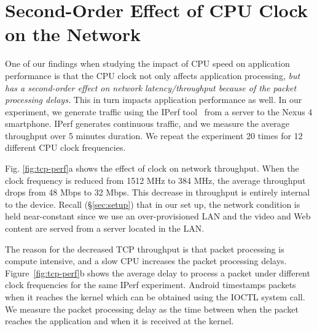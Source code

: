 
\begin{figure*}[h]
     \vspace{-0.1in}
     \caption{Second-order effect of CPU speed on network. (a) TCP throughput reduces from an average of 48 Mbps to 32 Mbps under slow clock under the same network conditions, b) The cause for this reduction in throughput is internal to the device; the average TCP packet processing delay increases by 12 ms at slow CPU speeds. Experiments conducted on Nexus 4.}
     \label{fig:tcp-perf}
\end{figure*}

\section{Second-Order Effect of CPU Clock on the Network} \label{label:throughput}

One of our findings when studying the impact of CPU speed on application performance is that 
the CPU clock not only affects application processing, {\em but has a second-order effect on network 
latency/throughput because of the packet processing delays.} This in turn impacts
application performance as well. In our experiment, we generate traffic using the IPerf tool~\cite{iperf-2015} from a server to the Nexus 4 smartphone. IPerf generates continuous traffic, and we measure the average throughput over 5 minutes duration. We repeat the experiment 20 times for 12 different CPU clock frequencies. 

Fig. \ref{fig:tcp-perf}a shows the effect of clock on network throughput. When the clock frequency is reduced from 1512 MHz to 384 MHz, the average throughput drops from 48 Mbps to 32 Mbps. This decrease in throughput is entirely internal to the device. Recall (\S\ref{sec:setup}) that in our set up, the network condition is held near-constant since we use an over-provisioned LAN and the video and Web content are served from a server located in the LAN. 

The reason for the decreased TCP throughput is that packet processing is compute intensive, and a slow CPU increases the packet processing delays. Figure~\ref{fig:tcp-perf}b shows the average delay to process a packet under different clock frequencies for the same IPerf experiment. Android timestamps packets when it reaches the kernel which can be obtained using the IOCTL system call. We measure the packet processing delay as the time between when the packet reaches the application and when it is received at the kernel.

